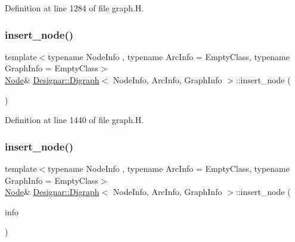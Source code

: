 Definition at line 1284 of file graph.\+H.

\mbox{\label{class_designar_1_1_digraph_a6ee69792c537ce241a2e448da1b46f1b}} 
\subsubsection{\texorpdfstring{insert\+\_\+node()}{insert\_node()}\hspace{0.1cm}{\footnotesize\ttfamily [2/4]}}
{\footnotesize\ttfamily template$<$typename Node\+Info , typename Arc\+Info  = Empty\+Class, typename Graph\+Info  = Empty\+Class$>$ \\
\hyperlink{class_designar_1_1_digraph_a4dc921c41a480b7946a04170e997d8ae}{Node}\& \hyperlink{class_designar_1_1_digraph}{Designar\+::\+Digraph}$<$ Node\+Info, Arc\+Info, Graph\+Info $>$\+::insert\+\_\+node (\begin{DoxyParamCaption}{ }\end{DoxyParamCaption})\hspace{0.3cm}{\ttfamily [inline]}}



Definition at line 1440 of file graph.\+H.

\mbox{\label{class_designar_1_1_digraph_a292dae36c1ee1fa581013c908ecebd1c}} 
\subsubsection{\texorpdfstring{insert\+\_\+node()}{insert\_node()}\hspace{0.1cm}{\footnotesize\ttfamily [3/4]}}
{\footnotesize\ttfamily template$<$typename Node\+Info , typename Arc\+Info  = Empty\+Class, typename Graph\+Info  = Empty\+Class$>$ \\
\hyperlink{class_designar_1_1_digraph_a4dc921c41a480b7946a04170e997d8ae}{Node}\& \hyperlink{class_designar_1_1_digraph}{Designar\+::\+Digraph}$<$ Node\+Info, Arc\+Info, Graph\+Info $>$\+::insert\+\_\+node (\begin{DoxyParamCaption}\item[{const Node\+Info \&}]{info }\end{DoxyParamCaption})\hspace{0.3cm}{\ttfamily [inline]}}



